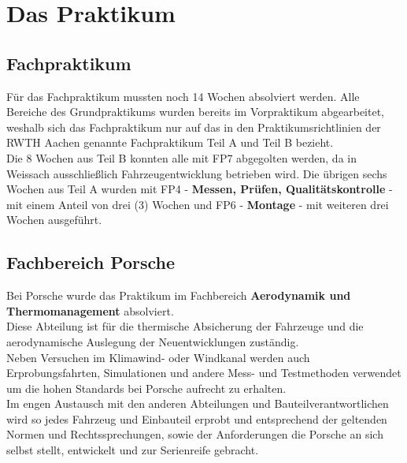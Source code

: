 \chapter{Das Praktikum}

\section{Fachpraktikum}

Für das Fachpraktikum mussten noch 14 Wochen absolviert werden. Alle Bereiche des Grundpraktikums wurden bereits im Vorpraktikum abgearbeitet, weshalb sich das Fachpraktikum nur auf das in den Praktikumsrichtlinien der RWTH Aachen genannte Fachpraktikum Teil A und Teil B bezieht.\\
Die 8 Wochen aus Teil B konnten alle mit FP7 abgegolten werden, da in Weissach ausschließlich Fahrzeugentwicklung betrieben wird. Die übrigen sechs Wochen aus Teil A wurden mit FP4 - \textbf{Messen, Prüfen, Qualitätskontrolle} - mit einem Anteil von drei (3) Wochen und FP6 - \textbf{Montage} - mit weiteren drei Wochen ausgeführt.\\

\section{Fachbereich Porsche}

Bei Porsche wurde das Praktikum im Fachbereich \textbf{Aerodynamik und Thermomanagement} absolviert. \\
Diese Abteilung ist für die thermische Absicherung der Fahrzeuge und die aerodynamische Auslegung der Neuentwicklungen zuständig.\\
Neben Versuchen im Klimawind- oder Windkanal werden auch Erprobungsfahrten, Simulationen und andere Mess- und Testmethoden verwendet um die hohen Standards bei Porsche aufrecht zu erhalten. \\
Im engen Austausch mit den anderen Abteilungen und Bauteilverantwortlichen wird so jedes Fahrzeug und Einbauteil erprobt und entsprechend der geltenden Normen und Rechtssprechungen, sowie der Anforderungen die Porsche an sich selbst stellt, entwickelt und zur Serienreife gebracht.